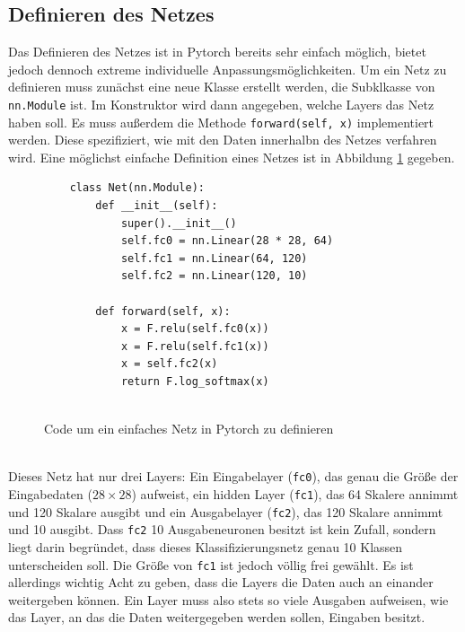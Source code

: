 \documentclass[11pt]{article}
\begin{document}
\subsection{Definieren des Netzes}
Das Definieren des Netzes ist in Pytorch bereits sehr einfach möglich, bietet jedoch dennoch extreme individuelle Anpassungsmöglichkeiten. Um ein Netz zu definieren muss zunächst eine neue Klasse erstellt werden, die Subklkasse von \texttt{nn.Module} ist. Im Konstruktor wird dann angegeben, welche Layers das Netz haben soll. Es muss außerdem die Methode \texttt{forward(self, x)} implementiert werden. Diese spezifiziert, wie mit den Daten innerhalbn des Netzes verfahren wird. Eine möglichst einfache Definition  eines Netzes ist in Abbildung \ref{Net_simple_definition} gegeben.
\begin{figure}[h]
	\begin{verbatim}
	class Net(nn.Module):
		def __init__(self):
			super().__init__()
			self.fc0 = nn.Linear(28 * 28, 64)
			self.fc1 = nn.Linear(64, 120)
			self.fc2 = nn.Linear(120, 10)
	
		def forward(self, x):
			x = F.relu(self.fc0(x))
			x = F.relu(self.fc1(x))
			x = self.fc2(x)
			return F.log_softmax(x)
	
	\end{verbatim}
	\caption{Code um ein einfaches Netz in Pytorch zu definieren}
	\label{Net_simple_definition}
\end{figure}\\
Dieses Netz hat nur drei Layers: Ein Eingabelayer (\texttt{fc0}), das genau die Größe der Eingabedaten ($28\times28$) aufweist, ein hidden Layer (\texttt{fc1}), das 64 Skalere annimmt und 120 Skalare ausgibt und ein Ausgabelayer (\texttt{fc2}), das 120 Skalare annimmt und 10 ausgibt. Dass \texttt{fc2} 10 Ausgabeneuronen besitzt ist kein Zufall, sondern liegt darin begründet, dass dieses Klassifizierungsnetz genau 10 Klassen unterscheiden soll. Die Größe von \texttt{fc1} ist jedoch völlig frei gewählt. Es ist allerdings wichtig Acht zu geben, dass die Layers die Daten auch an einander weitergeben können. Ein Layer muss also stets so viele Ausgaben aufweisen, wie das Layer, an das die Daten weitergegeben werden sollen, Eingaben besitzt.\\
\end{document}
